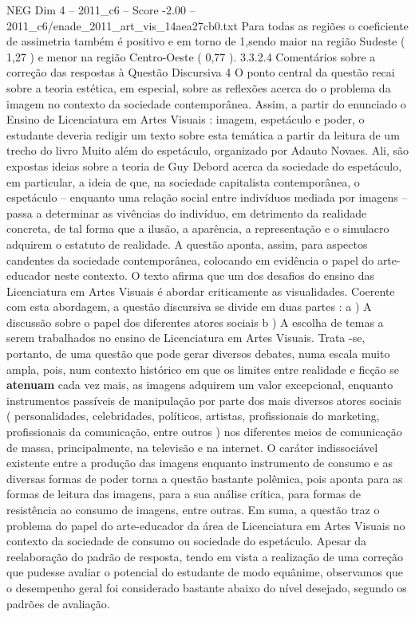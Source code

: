 \begin{textsample}{NEG Dim 4 – 2011\_c6 – Score -2.00 – 2011\_c6/enade\_2011\_art\_vis\_14aea27cb0.txt}
Para todas as regiões o coeficiente de assimetria também é positivo e em torno de 1,sendo maior na região Sudeste ( 1,27 ) e menor na região Centro-Oeste ( 0,77 ). 3.3.2.4 Comentários sobre a correção das respostas à Questão Discursiva 4 O ponto central da questão recai sobre a teoria estética, em especial, sobre as reflexões acerca do o problema da imagem no contexto da sociedade contemporânea.
Assim, a partir do enunciado o Ensino de Licenciatura em Artes Visuais : imagem, espetáculo e poder, o estudante deveria redigir um texto sobre esta temática a partir da leitura de um trecho do livro Muito além do espetáculo, organizado por Adauto Novaes.
Ali, são expostas ideias sobre a teoria de Guy Debord acerca da sociedade do espetáculo, em particular, a ideia de que, na sociedade capitalista contemporânea, o espetáculo – enquanto uma relação social entre indivíduos mediada por imagens – passa a determinar as vivências do indivíduo, em detrimento da realidade concreta, de tal forma que a ilusão, a aparência, a representação e o simulacro adquirem o estatuto de realidade.
A questão aponta, assim, para aspectos candentes da sociedade contemporânea, colocando em evidência o papel do arte-educador neste contexto.
O texto afirma que um dos desafios do ensino das Licenciatura em Artes Visuais é abordar criticamente as visualidades.
Coerente com esta abordagem, a questão discursiva se divide em duas partes : a ) A discussão sobre o papel dos diferentes atores sociais b ) A escolha de temas a serem trabalhados no ensino de Licenciatura em Artes Visuais.
Trata -se, portanto, de uma questão que pode gerar diversos debates, numa escala muito ampla, pois, num contexto histórico em que os limites entre realidade e ficção se \textbf{atenuam} cada vez mais, as imagens adquirem um valor excepcional, enquanto instrumentos passíveis de manipulação por parte dos mais diversos atores sociais ( personalidades, celebridades, políticos, artistas, profissionais do marketing, profissionais da comunicação, entre outros ) nos diferentes meios de comunicação de massa, principalmente, na televisão e na internet.
O caráter indissociável existente entre a produção das imagens enquanto instrumento de consumo e as diversas formas de poder torna a questão bastante polêmica, pois aponta para as formas de leitura das imagens, para a sua análise crítica, para formas de resistência ao consumo de imagens, entre outras.
Em suma, a questão traz o problema do papel do arte-educador da área de Licenciatura em Artes Visuais no contexto da sociedade de consumo ou sociedade do espetáculo.
Apesar da reelaboração do padrão de resposta, tendo em vista a realização de uma correção que pudesse avaliar o potencial do estudante de modo equânime, observamos que o desempenho geral foi considerado bastante abaixo do nível desejado, segundo os padrões de avaliação.

\end{textsample}
